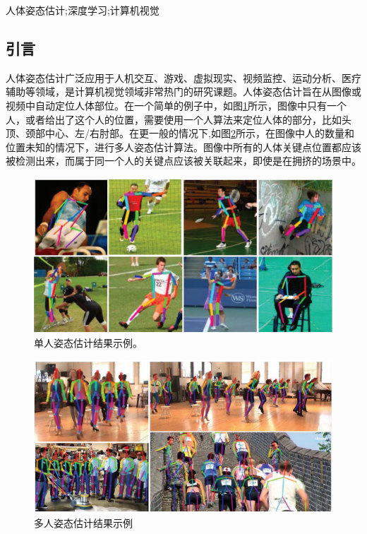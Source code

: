\documentclass[hyperref]{ctexart}
\begin{document}
	人体姿态估计;深度学习;计算机视觉
	\begin{multicols}{2}
		\section{引言}
		人体姿态估计广泛应用于人机交互、游戏、虚拟现实、视频监控、运动分析、医疗辅助等领域，是计算机视觉领域非常热门的研究课题\cite{DBLP:journals/corr/PapandreouZKTTB17}\cite{DBLP:conf/eccv/InsafutdinovPAA16}\cite{DBLP:conf/cvpr/CaoSWS17}\cite{wei2016convolutional}。人体姿态估计旨在从图像或视频中自动定位人体部位。在一个简单的例子中，如图\ref{a}所示，图像中只有一个人，或者给出了这个人的位置，需要使用一个人算法来定位人体的部分，比如头顶、颈部中心、左/右肘部\cite{chen2014articulated}\cite{martinez2017simple}\cite{chen2017adversarial}。在更一般的情况下,如图\ref{b}所示，在图像中人的数量和位置未知的情况下，进行多人姿态估计算法\cite{DBLP:conf/eccv/InsafutdinovPAA16}\cite{DBLP:conf/cvpr/CaoSWS17}\cite{pishchulin2016deepcut}。图像中所有的人体关键点位置都应该被检测出来，而属于同一个人的关键点应该被关联起来，即使是在拥挤的场景中。
		
		\begin{figure}[H]
			\centering
			\includegraphics[scale = 0.3]{1}
			\caption{单人姿态估计结果示例\cite{toshev2014deeppose}。}
			\label{a}
		\end{figure}
		
		\begin{figure}[H]
			\centering
			\includegraphics[scale = 0.3]{2}
			\caption{多人姿态估计结果示例\cite{DBLP:conf/cvpr/CaoSWS17}}
			\label{b}
		\end{figure}
	

\end{multicols}
\end{document}
